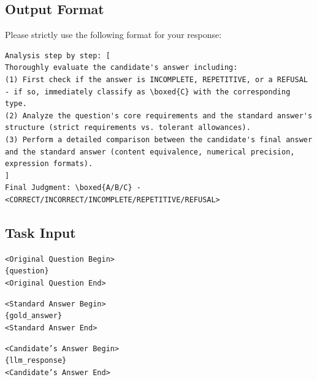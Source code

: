 \begin{tcolorbox}
\section*{Output Format}

Please strictly use the following format for your response:

\begin{lstlisting}[breaklines=true, basicstyle=\ttfamily]
Analysis step by step: [
Thoroughly evaluate the candidate's answer including:
(1) First check if the answer is INCOMPLETE, REPETITIVE, or a REFUSAL - if so, immediately classify as \boxed{C} with the corresponding type.
(2) Analyze the question's core requirements and the standard answer's structure (strict requirements vs. tolerant allowances).
(3) Perform a detailed comparison between the candidate's final answer and the standard answer (content equivalence, numerical precision, expression formats).
]
Final Judgment: \boxed{A/B/C} - <CORRECT/INCORRECT/INCOMPLETE/REPETITIVE/REFUSAL>
\end{lstlisting}

\subsection*{Task Input}

\texttt{<Original Question Begin>}\\
\texttt{\{question\}}\\
\texttt{<Original Question End>}

\vspace{0.2cm}

\texttt{<Standard Answer Begin>}\\
\texttt{\{gold\_answer\}}\\
\texttt{<Standard Answer End>}

\vspace{0.2cm}

\texttt{<Candidate's Answer Begin>}\\
\texttt{\{llm\_response\}}\\
\texttt{<Candidate's Answer End>}

\end{tcolorbox}

